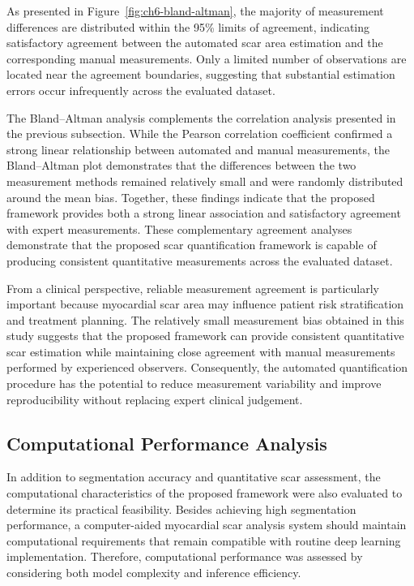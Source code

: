 As presented in Figure~\ref{fig:ch6-bland-altman}, the majority of measurement differences are distributed within the 95\% limits of agreement, indicating satisfactory agreement between the automated scar area estimation and the corresponding manual measurements. Only a limited number of observations are located near the agreement boundaries, suggesting that substantial estimation errors occur infrequently across the evaluated dataset.

The Bland--Altman analysis complements the correlation analysis presented in the previous subsection. While the Pearson correlation coefficient confirmed a strong linear relationship between automated and manual measurements, the Bland--Altman plot demonstrates that the differences between the two measurement methods remained relatively small and were randomly distributed around the mean bias. Together, these findings indicate that the proposed framework provides both a strong linear association and satisfactory agreement with expert measurements. These complementary agreement analyses demonstrate that the proposed scar quantification framework is capable of producing consistent quantitative measurements across the evaluated dataset.

From a clinical perspective, reliable measurement agreement is particularly important because myocardial scar area may influence patient risk stratification and treatment planning. The relatively small measurement bias obtained in this study suggests that the proposed framework can provide consistent quantitative scar estimation while maintaining close agreement with manual measurements performed by experienced observers. Consequently, the automated quantification procedure has the potential to reduce measurement variability and improve reproducibility without replacing expert clinical judgement.

\subsection{Computational Performance Analysis}
\label{subsec:ch6-computation}

In addition to segmentation accuracy and quantitative scar assessment, the computational characteristics of the proposed framework were also evaluated to determine its practical feasibility. Besides achieving high segmentation performance, a computer-aided myocardial scar analysis system should maintain computational requirements that remain compatible with routine deep learning implementation. Therefore, computational performance was assessed by considering both model complexity and inference efficiency.

